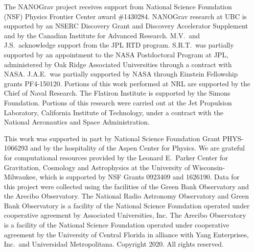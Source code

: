 The NANOGrav project receives support from National Science Foundation (NSF) Physics Frontier Center award \#1430284.
NANOGrav research at UBC is supported by an NSERC Discovery Grant and Discovery Accelerator Supplement and by the Canadian Institute for Advanced Research.
M.V.\ and J.S.\ acknowledge support from the JPL RTD program.
S.R.T.\ was partially supported by an appointment to the NASA Postdoctoral Program at JPL, administered by Oak Ridge Associated Universities through a contract with NASA.
J.A.E.\ was partially supported by NASA through Einstein Fellowship grants PF4-150120.
Portions of this work performed at NRL are supported by the Chief of Naval Research.
The Flatiron Institute is supported by the Simons Foundation.
Portions of this research were carried out at the Jet Propulsion Laboratory, California Institute of Technology, under a contract with the National Aeronautics and Space Administration.
\par

This work was supported in part by National Science Foundation Grant PHYS-1066293 and by the hospitality of the Aspen Center for Physics.
We are grateful for computational resources provided by the Leonard E.\ Parker Center for Gravitation, Cosmology and Astrophysics at the University of Wisconsin-Milwaukee, which is supported by NSF Grants 0923409 and 1626190.
Data for this project were collected using the facilities of the Green Bank Observatory and the Arecibo Observatory.
The National Radio Astronomy Observatory and Green Bank Observatory is a facility of the National Science Foundation operated under cooperative agreement by Associated Universities, Inc.
The Arecibo Observatory is a facility of the National Science Foundation operated under cooperative agreement by the University of Central Florida in alliance with Yang Enterprises, Inc.\ and Universidad Metropolitana.
Copyright 2020. All rights reserved.
